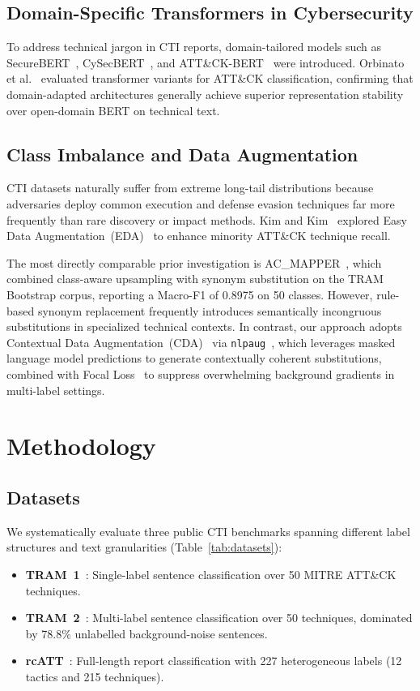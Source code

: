 \documentclass[runningheads]{llncs}
\begin{document}
\subsection{Domain-Specific Transformers in Cybersecurity}
To address technical jargon in CTI reports, domain-tailored models such as SecureBERT~\cite{aghaei2022securebert}, CySecBERT~\cite{bayer2022cybersecbert}, and ATT\&CK-BERT~\cite{baseldella2022attackbert} were introduced. Orbinato et al.~\cite{orbinato2022automatic} evaluated transformer variants for ATT\&CK classification, confirming that domain-adapted architectures generally achieve superior representation stability over open-domain BERT on technical text.

\subsection{Class Imbalance and Data Augmentation}
CTI datasets naturally suffer from extreme long-tail distributions because adversaries deploy common execution and defense evasion techniques far more frequently than rare discovery or impact methods. Kim and Kim~\cite{kim2022ttp} explored Easy Data Augmentation~(EDA)~\cite{wei2019eda} to enhance minority ATT\&CK technique recall. 

The most directly comparable prior investigation is AC\_MAPPER~\cite{albarrak2025acmapper}, which combined class-aware upsampling with synonym substitution on the TRAM Bootstrap corpus, reporting a Macro-F1 of 0.8975 on 50 classes. However, rule-based synonym replacement frequently introduces semantically incongruous substitutions in specialized technical contexts. In contrast, our approach adopts Contextual Data Augmentation~(CDA)~\cite{kobayashi2018contextual} via \texttt{nlpaug}~\cite{ma2019nlpaug}, which leverages masked language model predictions to generate contextually coherent substitutions, combined with Focal Loss~\cite{lin2017focal} to suppress overwhelming background gradients in multi-label settings.

\section{Methodology}

\subsection{Datasets}
We systematically evaluate three public CTI benchmarks spanning different label structures and text granularities (Table~\ref{tab:datasets}):
\begin{itemize}
  \item \textbf{TRAM~1}~\cite{mitre2023tram}: Single-label sentence classification over 50 MITRE ATT\&CK techniques.
  \item \textbf{TRAM~2}~\cite{mitre2023tram}: Multi-label sentence classification over 50 techniques, dominated by 78.8\% unlabelled background-noise sentences.
  \item \textbf{rcATT}~\cite{legoy2020rcatt}: Full-length report classification with 227 heterogeneous labels (12 tactics and 215 techniques).
\end{itemize}
\end{document}
